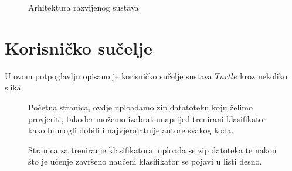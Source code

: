 \begin{figure}[H]
	\centering
	\caption{Arhitektura razvijenog sustava}
	\label{fig:architecture}
\end{figure}

\newpage
\section{Korisničko sučelje}

U ovom potpoglavlju opisano je korisničko sučelje sustava $Turtle$ kroz nekoliko slika.


\begin{figure}[H]
	\centering
	\caption{Početna stranica, ovdje uploadamo zip datatoteku koju želimo provjeriti, također možemo izabrat unaprijed trenirani klasifikator kako bi mogli dobili i najvjerojatnije autore svakog koda.}
\end{figure}

\begin{figure}[H]
	\centering
	\caption{Stranica za treniranje klasifikatora, uploada se zip datoteka te nakon što je učenje završeno naučeni klasifikator se pojavi u listi desno.}
\end{figure}

